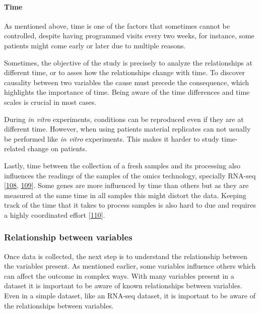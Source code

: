 \documentclass[
  12pt,
  a4paper,
  twoside,
  openright]{book}
\begin{document}
\hypertarget{time}{%
\paragraph*{Time}\label{time}}

As mentioned above, time is one of the factors that sometimes cannot be controlled, despite having programmed visits every two weeks, for instance, some patients might come early or later due to multiple reasons.

Sometimes, the objective of the study is precisely to analyze the relationships at different time, or to asses how the relationships change with time.
To discover causality between two variables the cause must precede the consequence, which highlights the importance of time.
Being aware of the time differences and time scales is crucial in most cases.

During \emph{in vitro} experiments, conditions can be reproduced even if they are at different time.
However, when using patients material replicates can not usually be performed like \emph{in vitro} experiments.
This makes it harder to study time-related change on patients.

Lastly, time between the collection of a fresh samples and its processing also influences the readings of the samples of the omics technology, specially RNA-seq {[}\protect\hyperlink{ref-massoni-badosa2020}{108}, \protect\hyperlink{ref-zhu2017}{109}{]}.
Some genes are more influenced by time than others but as they are measured at the same time in all samples this might distort the data.
Keeping track of the time that it takes to process samples is also hard to due and requires a highly coordinated effort {[}\protect\hyperlink{ref-ferreira2018}{110}{]}.

\hypertarget{relationship-between-variables}{%
\subsubsection{Relationship between variables}\label{relationship-between-variables}}

Once data is collected, the next step is to understand the relationship between the variables present.
As mentioned earlier, some variables influence others which can affect the outcome in complex ways.
With many variables present in a dataset it is important to be aware of known relationships between variables.
Even in a simple dataset, like an RNA-seq dataset, it is important to be aware of the relationships between variables.
\end{document}
